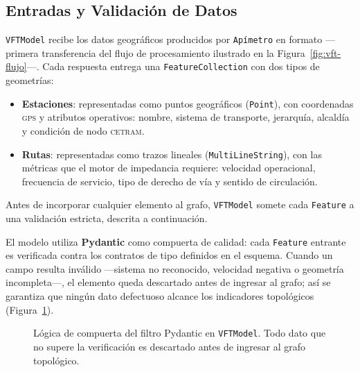 
\subsection{Entradas y Validación de Datos}
\label{sec:vft-entradas}

\label{subsec:vft-geojson}

\texttt{VFTModel} recibe los datos geográficos producidos por \texttt{Apímetro} en formato
\geojson{} \citep{butler2016geojson} —primera transferencia del flujo de
procesamiento ilustrado en la Figura~\ref{fig:vft-flujo}—. Cada respuesta
entrega una \texttt{FeatureCollection} con dos tipos de geometrías:

\begin{itemize}
    \item \textbf{Estaciones}: representadas como puntos geográficos
    (\texttt{Point}), con coordenadas \textsc{gps} y atributos operativos:
    nombre, sistema de transporte, jerarquía, alcaldía y condición de nodo
    \textsc{cetram}.
    \item \textbf{Rutas}: representadas como trazos lineales
    (\texttt{MultiLineString}), con las métricas que el motor de impedancia
    requiere: velocidad operacional, frecuencia de servicio, tipo de derecho
    de vía y sentido de circulación.
\end{itemize}

Antes de incorporar cualquier elemento al grafo, \texttt{VFTModel} somete cada
\texttt{Feature} a una validación estricta, descrita a
continuación.

\label{subsec:vft-pydantic}

El modelo utiliza \textbf{Pydantic} como compuerta de calidad: cada
\texttt{Feature} entrante es verificada contra los contratos de tipo definidos
en el esquema. Cuando un campo resulta inválido —sistema no reconocido,
velocidad negativa o geometría incompleta—, el elemento queda descartado antes
de ingresar al grafo; así se garantiza que ningún dato defectuoso alcance los
indicadores topológicos (Figura~\ref{fig:vft-pydantic}).

\begin{figure}[H]
    \centering
    \resizebox{0.82\linewidth}{!}{%
        }%
    \caption[Lógica de compuerta del filtro de validación Pydantic]{Lógica de
    compuerta del filtro Pydantic en \texttt{VFTModel}. Todo dato que no supere la
    verificación es descartado antes de ingresar al grafo topológico.}
    \label{fig:vft-pydantic}
\end{figure}

